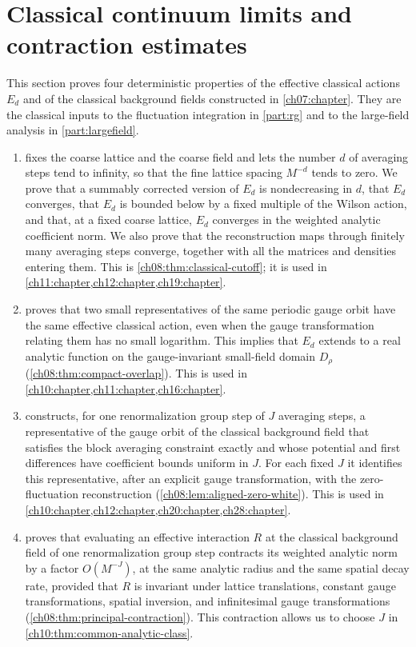 \chapter{Classical continuum limits and contraction estimates}\label{ch08:chapter}

This section proves four deterministic properties of the effective classical actions $E_d$ and of the classical background fields constructed in \cref{ch07:chapter}. They are the classical inputs to the fluctuation integration in \cref{part:rg} and to the large-field analysis in \cref{part:largefield}.
\begin{enumerate}
\item {} fixes the coarse lattice and the coarse field and lets the number $d$ of averaging steps tend to infinity, so that the fine lattice spacing $M^{-d}$ tends to zero. We prove that a summably corrected version of $E_d$ is nondecreasing in $d$, that $E_d$ converges, that $E_d$ is bounded below by a fixed multiple of the Wilson action, and that, at a fixed coarse lattice, $E_d$ converges in the weighted analytic coefficient norm. We also prove that the reconstruction maps through finitely many averaging steps converge, together with all the matrices and densities entering them. This is \cref{ch08:thm:classical-cutoff}; it is used in \cref{ch11:chapter,ch12:chapter,ch19:chapter}.
\item {} proves that two small representatives of the same periodic gauge orbit have the same effective classical action, even when the gauge transformation relating them has no small logarithm. This implies that $E_d$ extends to a real analytic function on the gauge-invariant small-field domain $D_\rho$ (\cref{ch08:thm:compact-overlap}). This is used in \cref{ch10:chapter,ch11:chapter,ch16:chapter}.
\item {} constructs, for one renormalization group step of $J$ averaging steps, a representative of the gauge orbit of the classical background field that satisfies the block averaging constraint exactly and whose potential and first differences have coefficient bounds uniform in $J$. For each fixed $J$ it identifies this representative, after an explicit gauge transformation, with the zero-fluctuation reconstruction (\cref{ch08:lem:aligned-zero-white}). This is used in \cref{ch10:chapter,ch12:chapter,ch20:chapter,ch28:chapter}.
\item {} proves that evaluating an effective interaction $R$ at the classical background field of one renormalization group step contracts its weighted analytic norm by a factor $O(M^{-J})$, at the same analytic radius and the same spatial decay rate, provided that $R$ is invariant under lattice translations, constant gauge transformations, spatial inversion, and infinitesimal gauge transformations (\cref{ch08:thm:principal-contraction}). This contraction allows us to choose $J$ in \cref{ch10:thm:common-analytic-class}.
\end{enumerate}

